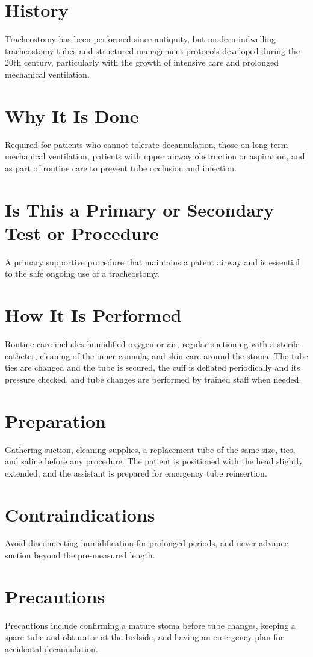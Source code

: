 \section*{History}
Tracheostomy has been performed since antiquity, but modern indwelling tracheostomy tubes and structured management protocols developed during the 20th century, particularly with the growth of intensive care and prolonged mechanical ventilation.
\section*{Why It Is Done}
Required for patients who cannot tolerate decannulation, those on long-term mechanical ventilation, patients with upper airway obstruction or aspiration, and as part of routine care to prevent tube occlusion and infection.
\section*{Is This a Primary or Secondary Test or Procedure}
A primary supportive procedure that maintains a patent airway and is essential to the safe ongoing use of a tracheostomy.
\section*{How It Is Performed}
Routine care includes humidified oxygen or air, regular suctioning with a sterile catheter, cleaning of the inner cannula, and skin care around the stoma. The tube ties are changed and the tube is secured, the cuff is deflated periodically and its pressure checked, and tube changes are performed by trained staff when needed.
\section*{Preparation}
Gathering suction, cleaning supplies, a replacement tube of the same size, ties, and saline before any procedure. The patient is positioned with the head slightly extended, and the assistant is prepared for emergency tube reinsertion.
\section*{Contraindications}
Avoid disconnecting humidification for prolonged periods, and never advance suction beyond the pre-measured length.

\section*{Precautions}
Precautions include confirming a mature stoma before tube changes, keeping a spare tube and obturator at the bedside, and having an emergency plan for accidental decannulation.

